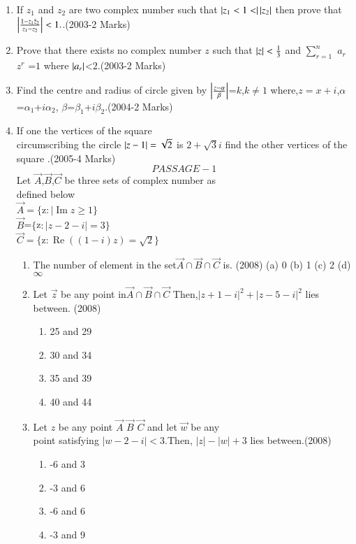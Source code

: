 \documentclass[journal]{IEEEtran}
\begin{document}
\begin{enumerate}[start=7]
\item If $z_1$ and $z_2$ are two  complex number such that $\left\vert z_1<1<\right\vert\left\vert z_2\right\vert$ then prove that $\left\vert\frac{1-z_1 \bar z_2}{z_1-z_2}\right\vert<1.$.\hfill(2003-2 Marks)\\
\item Prove that there exists no  complex number $z$ such that $\left\vert z\right\vert<\frac{1}{3}$ and  $\sum_{r=1}^{n}$ $a_r$ $z^r$ =$1$ where $\left\vert a_r\right\vert$<$2$.\hfill (2003-2 Marks)\\
\item Find the centre and radius  of circle given by
$\left\vert\frac{z-\alpha} \beta\right\vert$=$k$,$k\not=1$ 
where,$z=x+i$,$\alpha$=$\alpha_1$+$i\alpha_2$,
$\beta$=$\beta_1$+$i\beta_2$.\hfill(2004-2 Marks) \\  \item If one the vertices of the square \\
circumscribing the circle $\left\vert z-1\right\vert = \sqrt{2}$ is $2 +\sqrt{3} i $  find the other vertices of the square .\hfill (2005-4 Marks) \\

$$PASSAGE-1$$
Let $\vec{A}$,$\vec{B}$,$\vec{C}$ be three sets of complex number as\\ 
defined below\\
$\vec{A} = \{ $z$ :\mid \operatorname{Im} z \geq 1 \}$\\
$\vec{B}$=$\{$z$:|z-2-i|=3\}$\\
$\vec{C} = \{$z$ : \operatorname{Re} \left((1-i)z\right) = \sqrt{2} \}$\\
\begin{enumerate}     
\item The number of element in the set$\vec{A} \cap\vec{B} \cap\vec{C} $
is. \hfill (2008)
   (a) 0 \hfill
   (b) 1 \hfill
   (c) 2 \hfill
   (d) $\infty$\\
\item Let $\vec{z}$ be any point in$ \vec{A}\cap\vec{B}\cap\vec{C} $ Then,$|z+1-i|^2+|z-5-i|^2$ lies between. \hfill  (2008) 
\begin{multicols}{2}
    \begin{enumerate}
        \item 25 and 29
        \item 30 and 34
        \item 35 and 39
        \item 40 and 44
    \end{enumerate}
\end{multicols}
\item  Let $z$ be any point $\vec{A}$ $\vec{B}$ $\vec{C}$ and let $\vec{w}$ be any\\
point satisfying $|w-2-i|<3$.Then, $|z|-|w|+3$ lies between.\hfill (2008) 
 \begin{multicols}{2}
  \begin{enumerate}
    \item -6 and 3
    \item -3 and 6 
    \item -6 and 6
    \item -3 and 9
  \end{enumerate}
 \end{multicols}


\end{enumerate}
\end{enumerate}
\end{document}
